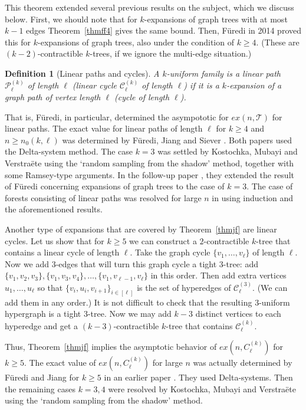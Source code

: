 \documentclass[graybox]{svmult}
\renewcommand{\ge}{\geqslant}
\newcommand{\m}{\mathcal}
\newtheorem{defn}[thm]{Definition}
\begin{document}
This theorem extended several previous results on the subject, which we discuss below. First, we should note that for $k$-expansions of graph trees with at most  $k-1$ edges Theorem~\ref{thmff4} gives the same bound. Then,  F\"uredi \cite{Fu14} in 2014 proved this for $k$-expansions of graph trees, also under the condition of $k\ge 4$. (These are $(k-2)$-contractible $k$-trees, if we ignore the multi-edge situation.)
\begin{defn}[Linear paths and cycles]\label{deflinear}
 A $k$-uniform family is a {\em linear path $\m P_\ell^{(k)}$} of length $\ell$ ({\em linear cycle} $\m C_\ell^{(k)}$ of length $\ell$) if it is a $k$-expansion of a graph path of vertex length $\ell$ (cycle of length $\ell$).
\end{defn}
That is, F\" uredi, in particular, determined the asympototic for $ex(n,\m T)$ for linear paths. The exact value for linear paths of length $\ell$ for $k\ge 4$ and $n\ge n_0(k,\ell)$ was determined by F\"uredi, Jiang and Siever \cite{FJS}. Both papers used the Delta-system method. The case $k=3$ was settled by Kostochka, Mubayi and Verstra\"ete \cite{KMV1} using the `random sampling from the shadow' method, together with some Ramsey-type arguments. In the follow-up paper \cite{KMV2}, they extended the result of F\"uredi \cite{Fu14} concerning expansions of graph trees to the case of $k=3$. The case of forests consisting of linear paths was resolved for large $n$ in \cite{BK} using induction and the aforementioned results.


Another type of expansions that are covered by Theorem~\ref{thmjf} are linear cycles. Let us show that for $k\ge 5$ we can construct a $2$-contractible $k$-tree that contains a linear cycle of length $\ell$. Take the graph cycle $\{v_1,\ldots,v_\ell\}$ of length $\ell$. Now we add $3$-edges that will turn this graph cycle a tight $3$-tree: add $\{v_1,v_2,v_3\}, \{v_1,v_3,v_4\},\ldots, \{v_1,v_{\ell-1},v_\ell\}$ in this order. Then add extra vertices
 $u_1,\ldots, u_\ell$ so that $\{v_i,u_i,v_{i+1}\}_{i\in[\ell]}$ is the set of hyperedges of $\m C^{(3)}_\ell$. (We can add them in any order.) It is not difficult to check that the resulting $3$-uniform hypergraph is a tight $3$-tree. Now we may add $k-3$ distinct vertices to each hyperedge and  get a $(k-3)$-contractible $k$-tree that contains $\m C^{(k)}_\ell$.

 Thus, Theorem~\ref{thmjf} implies the asymptotic behavior of $ex(n,C^{(k)}_\ell)$ for $k\ge 5$. The exact value of  $ex(n,C^{(k)}_\ell)$ for large $n$ was actually determined by F\"uredi and Jiang for $k\ge 5$ in an earlier paper \cite{FJ13}. They used Delta-systems. Then the remaining cases $k=3,4$ were resolved by Kostochka, Mubayi and Verstra\"ete \cite{KMV1} using the `random sampling from the shadow' method.
\end{document}
